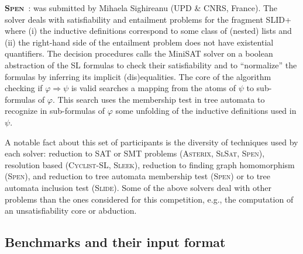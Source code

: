 \documentclass[twoside,11pt]{article}
\newcommand{\limp}{\Rightarrow}
\newcommand{\SLRD}{\textsc{SLID}}
\newcommand{\ASTERIX}{\textsc{Asterix}}
\newcommand{\CYCLIST}{\textsc{Cyclist-SL}}
\newcommand{\SLEEK}{\textsc{Sleek}}
\newcommand{\SLIDE}{\textsc{Slide}}
\newcommand{\SLSAT}{\textsc{SlSat}}
\newcommand{\SPEN}{\textsc{Spen}}
\begin{document}
\medskip
\noindent
\textbf{\SPEN}~\cite{EneaLSV14,SPENsite}:
was submitted by 
Mihaela Sighireanu (UPD \& CNRS, France).
The solver deals with satisfiability and entailment problems for the fragment \SLRD+ where 
(i) the inductive definitions correspond to some class of (nested) lists
and (ii) the right-hand side of the entailment problem does not have existential quantifiers.
The decision procedures calls the MiniSAT solver on a boolean abstraction of the SL formulas to check their satisfiability and to ``normalize'' the formulas by inferring its implicit (dis)equalities. %
The core of the algorithm checking if $\varphi\limp\psi$ is valid searches a mapping from the atoms of $\psi$ to sub-formulas of $\varphi$.
This search uses the membership test in tree automata to recognize in sub-formulas of $\varphi$ some unfolding of the inductive definitions used in $\psi$.


\medskip
A notable fact about this set of participants is the diversity of techniques used by each solver:
reduction to SAT or SMT problems (\ASTERIX, \SLSAT, \SPEN),
resolution based (\CYCLIST, \SLEEK),
reduction to finding graph homomorphism (\SPEN), and
reduction to tree automata membership test (\SPEN) or to tree automata inclusion test (\SLIDE).
%
Some of the above solvers deal with other problems than the ones considered for this competition, e.g., the computation of an unsatisfiability core or abduction.


\subsection{Benchmarks and their input format}
\end{document}
